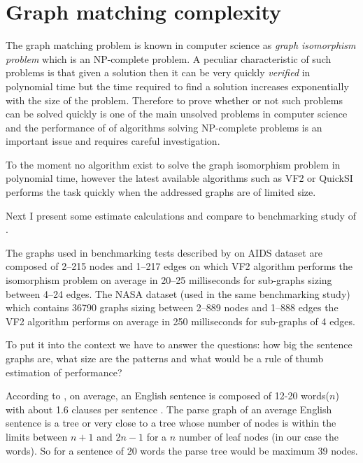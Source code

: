 

\section{Graph matching complexity}
The graph matching problem is known in computer science as \textit{graph isomorphism problem} which is an NP-complete problem. 
A peculiar characteristic of such problems is that given a solution then it can be very quickly \textit{verified} in polynomial time but the time required to find a solution increases exponentially with the size of the problem. Therefore to prove whether or not such problems can be solved quickly is one of the main unsolved problems in computer science and the performance of of algorithms solving NP-complete problems is an important issue and requires careful investigation. 

To the moment no algorithm exist to solve the graph isomorphism problem in polynomial time, however the latest available algorithms such as VF2 \cite{Cordella2001,Cordella2004} or QuickSI \cite{Shang2008} performs the task quickly when the addressed graphs are of limited size. 

Next I present some estimate calculations and compare to benchmarking study of \citet{Lee2013}.

The graphs used in benchmarking tests described by \citep{Lee2013} on AIDS dataset are composed of 2--215 nodes and 1--217 edges on which VF2 algorithm performs the isomorphism problem on average in 20--25 milliseconds for sub-graphs sizing between 4--24 edges. The NASA dataset (used in the same benchmarking study) which contains 36790 graphs sizing between 2--889 nodes and 1--888 edges the VF2 algorithm performs on average in 250 milliseconds for sub-graphs of 4 edges.

To put it into the context we have to answer the questions: how big the sentence graphs are, what size are the patterns and what would be a rule of thumb estimation of performance?

According to \citep{Koeva2012}, on average, an English sentence is composed of 12-20 words($n$) with about 1.6 clauses per sentence . %
The parse graph of an average English sentence is a tree or very close to a tree whose number of nodes is within the limits between $n+1$ and $2n-1$ for a $n$ number of leaf nodes (in our case the words). So for a sentence of 20 words the parse tree would be maximum 39 nodes.

